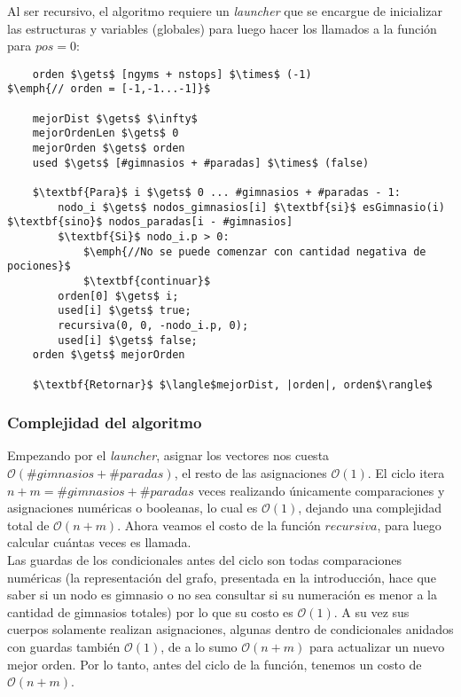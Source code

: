     Al ser recursivo, el algoritmo requiere un \emph{launcher} que se encargue de inicializar las estructuras y variables (globales) para luego hacer los llamados a la función para $pos=0$:

    \begin{lstlisting}
    orden $\gets$ [ngyms + nstops] $\times$ (-1)                $\emph{// orden = [-1,-1...-1]}$

    mejorDist $\gets$ $\infty$
    mejorOrdenLen $\gets$ 0
    mejorOrden $\gets$ orden
    used $\gets$ [#gimnasios + #paradas] $\times$ (false)

    $\textbf{Para}$ i $\gets$ 0 ... #gimnasios + #paradas - 1:
        nodo_i $\gets$ nodos_gimnasios[i] $\textbf{si}$ esGimnasio(i) $\textbf{sino}$ nodos_paradas[i - #gimnasios]
        $\textbf{Si}$ nodo_i.p > 0:
            $\emph{//No se puede comenzar con cantidad negativa de pociones}$
            $\textbf{continuar}$
        orden[0] $\gets$ i;
        used[i] $\gets$ true;
        recursiva(0, 0, -nodo_i.p, 0);
        used[i] $\gets$ false;
    orden $\gets$ mejorOrden

    $\textbf{Retornar}$ $\langle$mejorDist, |orden|, orden$\rangle$
    \end{lstlisting}

    \subsubsection{Complejidad del algoritmo}

    Empezando por el \emph{launcher}, asignar los vectores nos cuesta $\mathcal{O}(\#gimnasios + \#paradas)$, el resto de las asignaciones $\mathcal{O}(1)$. El ciclo itera $n+m = \#gimnasios + \#paradas$ veces realizando únicamente comparaciones y asignaciones numéricas o booleanas, lo cual es $\mathcal{O}(1)$, dejando una complejidad total de $\mathcal{O}(n+m)$. Ahora veamos el costo de la función $recursiva$, para luego calcular cuántas veces es llamada.
    \\

    Las guardas de los condicionales antes del ciclo son todas comparaciones numéricas (la representación del grafo, presentada en la introducción, hace que saber si un nodo es gimnasio o no sea consultar si su numeración es menor a la cantidad de gimnasios totales) por lo que su costo es $\mathcal{O}(1)$. A su vez sus cuerpos solamente realizan asignaciones, algunas dentro de condicionales anidados con guardas también $\mathcal{O}(1)$, de a lo sumo $\mathcal{O}(n+m)$ para actualizar un nuevo mejor orden. Por lo tanto, antes del ciclo de la función, tenemos un costo de $\mathcal{O}(n+m)$.
    \\

